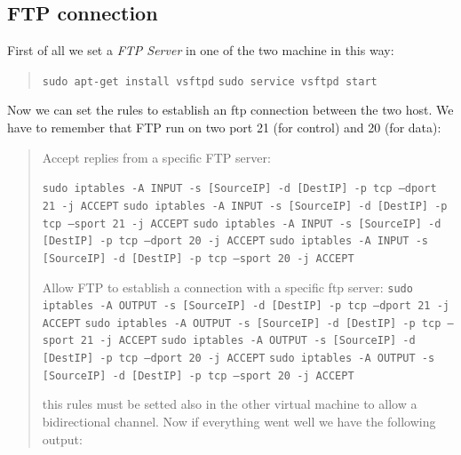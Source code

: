 \documentclass[11pt]{article}
\begin{document}
\subsection{FTP connection}
First of all we set a {\em FTP Server} in one of the two machine in this way:

\begin{quote}
 \texttt{sudo apt-get install vsftpd}\newline
 \texttt{sudo service vsftpd start}\newline
\end{quote}

Now we can set the rules to establish an ftp connection between the two host. We have to remember that FTP run on two port 21 (for control) and 20 (for data):

\begin{quote}
 Accept replies from a specific FTP server:

 \texttt{sudo iptables -A INPUT -s [SourceIP] -d [DestIP] -p tcp --dport 21 -j ACCEPT}\newline
 \texttt{sudo iptables -A INPUT -s [SourceIP] -d [DestIP] -p tcp --sport 21 -j ACCEPT}\newline
 \texttt{sudo iptables -A INPUT -s [SourceIP] -d [DestIP] -p tcp --dport 20 -j ACCEPT}\newline
 \texttt{sudo iptables -A INPUT -s [SourceIP] -d [DestIP] -p tcp --sport 20 -j ACCEPT}\newline

 Allow FTP to establish a connection with a specific ftp server:
 \texttt{sudo iptables -A OUTPUT -s [SourceIP] -d [DestIP] -p tcp --dport 21 -j ACCEPT}\newline
 \texttt{sudo iptables -A OUTPUT -s [SourceIP] -d [DestIP] -p tcp --sport 21 -j ACCEPT}\newline
 \texttt{sudo iptables -A OUTPUT -s [SourceIP] -d [DestIP] -p tcp --dport 20 -j ACCEPT}\newline
 \texttt{sudo iptables -A OUTPUT -s [SourceIP] -d [DestIP] -p tcp --sport 20 -j ACCEPT}\newline

 this rules must be setted also in the other virtual machine to allow a bidirectional channel. Now if everything went well we have the following output:


\end{quote}
\end{document}

